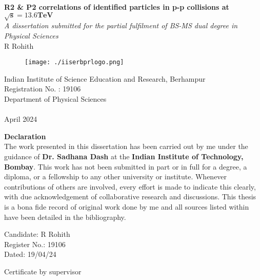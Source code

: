 \documentclass[12pt,a4paper,twoside]{report}
\newcommand{\usersetfontsize}[2]{\fontsize{#1}{#2}\selectfont}
\begin{document}
\usersetfontsize{12pt}{18pt}
\begin{titlepage}
{
	\centering
	\vspace*{2in}
	\textbf{\fontsize{16pt}{24pt}\selectfont R2 \& P2 correlations of identified particles in p-p collisions at $\mathbf{\sqrt{s}=13.6 TeV}$}%
	\\\vspace*{0.25in}
	\textit{A dissertation submitted for the partial fulfilment of BS-MS dual degree in Physical Sciences}%
	\\\vspace*{0.5in}
	{R Rohith}%
	\\\vspace*{2.8in}
	\begin{figure}[H]
		\centering
		\texttt{[image: ./iiserbprlogo.png]}
	\end{figure}
	{\usersetfontsize{14}{21}Indian Institute of Science Education and Research, Berhampur\\Registration No. : 19106\\Department of Physical Sciences\\}~\\
	{April 2024}\\
}	
\end{titlepage}
\vspace*{1in}
{\centering\Large \textbf{Declaration}\\}
\vspace*{0.5in}
The work presented in this dissertation has been carried out by me under the guidance of \textbf{Dr. Sadhana Dash} at the \textbf{Indian Institute of Technology, Bombay}. This work has not been submitted in part or in full for a degree, a diploma, or a fellowship to any other university or institute. Whenever contributions of others are involved, every effort is made to indicate this clearly, with due acknowledgement of collaborative research and discussions. This thesis is a bona fide record of original work done by me and all sources listed within have been detailed in the bibliography.
\vspace*{2.5in}
\begin{flushright}
	Candidate: R Rohith\\
	Register No.: 19106~~~\\
	Dated: 19/04/24~~~~~~~~~~
\end{flushright}
\newpage
Certificate by supervisor
\newpage
\vspace*{1in}
\end{document}
